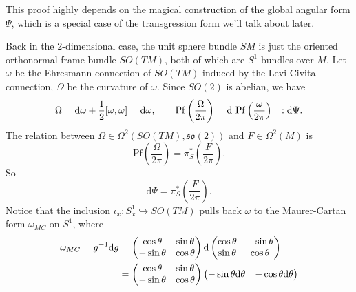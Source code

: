 This proof highly depends on the magical construction of the global angular form $\Psi$, 
which is a special case of the transgression form we'll talk about later.
\begin{remark}
    Back in the 2-dimensional case, the unit sphere bundle $SM$ is just the oriented orthonormal frame bundle $SO(TM)$, 
    both of which are $S^1$-bundles over $M$. Let $\omega$ be the Ehresmann connection of $SO(TM)$ induced by the Levi-Civita connection, 
    $\Omega$ be the curvature of $\omega$. Since $SO(2)$ is abelian, we have 
    \begin{equation*}
        \Omega = \mathrm{d}\omega + \frac{1}{2}[\omega, \omega] = \mathrm{d}\omega, \qquad 
        \mathrm{Pf}\left(\frac{\Omega}{2\pi}\right) = \md\ \mathrm{Pf}\left(\frac{\omega}{2\pi}\right) =: \md\Psi.
    \end{equation*}
    The relation between $\Omega\in \Omega^2(SO(TM), \mathfrak{so}(2))$ and $F\in \Omega^2(M)$ is
    \begin{equation*}
        \mathrm{Pf}\left(\frac{\Omega}{2\pi}\right) = \pi_S^*\left(\frac{F}{2\pi}\right).
    \end{equation*}
    So 
    \begin{equation}\label{equ:transgression-in-2d(1)}
        \mathrm{d}\Psi = \pi_S^*\left(\frac{F}{2\pi}\right).
    \end{equation}
    Notice that the inclusion $\iota_x:S^1_x \hookrightarrow SO(TM)$ pulls back $\omega$ to 
    the Maurer-Cartan form $\omega_{MC}$ on $S^1$, where 
    \begin{align*}
        \omega_{MC} = g^{-1}{\rm d} g &= 
        \begin{pmatrix}
            \cos\theta & \sin\theta \\
            -\sin\theta & \cos\theta
        \end{pmatrix} {\rm d} 
        \begin{pmatrix}
            \cos\theta & -\sin\theta \\
            \sin\theta & \cos\theta
        \end{pmatrix} \\ 
        &= 
        \begin{pmatrix}
            \cos\theta & \sin\theta \\
            -\sin\theta & \cos\theta            
        \end{pmatrix}
        \begin{pmatrix}
            -\sin\theta{\rm d}\theta & -\cos\theta{\rm d}\theta \\

\end{pmatrix}
\end{align*}
\end{remark}
